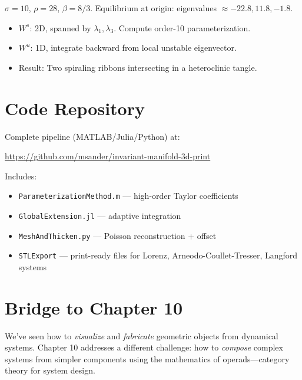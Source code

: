 \begin{example} \cite{bishop2026printing}
$\sigma=10$, $\rho=28$, $\beta=8/3$. Equilibrium at origin: eigenvalues $\approx -22.8, 11.8, -1.8$.
\begin{itemize}
    \item $W^s$: 2D, spanned by $\lambda_1, \lambda_3$. Compute order-10 parameterization.
    \item $W^u$: 1D, integrate backward from local unstable eigenvector.
    \item Result: Two spiraling ribbons intersecting in a heteroclinic tangle.
\end{itemize}
\end{example}

\section{Code Repository}
\label{sec:3dp:repo}

Complete pipeline (MATLAB/Julia/Python) at:
\begin{center}
\url{https://github.com/msander/invariant-manifold-3d-print} \cite{cabre2003parameterization}
\end{center}

Includes:
\begin{itemize}
    \item \texttt{ParameterizationMethod.m} --- high-order Taylor coefficients
    \item \texttt{GlobalExtension.jl} --- adaptive integration
    \item \texttt{MeshAndThicken.py} --- Poisson reconstruction + offset
    \item \texttt{STLExport} --- print-ready files for Lorenz, Arneodo-Coullet-Tresser, Langford systems \cite{bishop2026printing}
\end{itemize}

\section{Bridge to Chapter 10}
\label{sec:3dp:bridge}

We've seen how to \emph{visualize} and \emph{fabricate} geometric objects from dynamical systems. Chapter 10 addresses a different challenge: how to \emph{compose} complex systems from simpler components using the mathematics of operads---category theory for system design.

